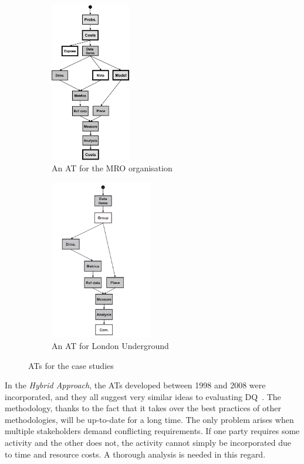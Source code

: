 \begin{figure}[htb]
    \centering
    
    \begin{subfigure}{0.45\textwidth}
        \includegraphics[height=7cm]{figures/hybrid-at-mro.jpg}
        \centering
        \caption{An AT for the MRO organisation}
        \label{fig:hybrid-at-mro}
    \end{subfigure}
    \begin{subfigure}{0.45\textwidth}
        \includegraphics[height=7cm]{figures/hybrid-at-lu.png}
        \centering
        \caption{An AT for London Underground}
        \label{fig:hybrid-at-lu}
    \end{subfigure}

    \caption{ATs for the case studies~\cite{woodal2013}}
    \label{fig:bybrid-at}
\end{figure}
\FloatBarrier

In the \textit{Hybrid Approach}, the ATs developed between 1998 and 2008 were incorporated, and they all suggest very similar ideas to evaluating DQ~\cite{woodal2013}.
The methodology, thanks to the fact that it takes over the best practices of other methodologies, will be up-to-date for a long time.
The only problem arises when multiple stakeholders demand conflicting requirements.
If one party requires some activity and the other does not, the activity cannot simply be incorporated due to time and resource costs.
A thorough analysis is needed in this regard.

